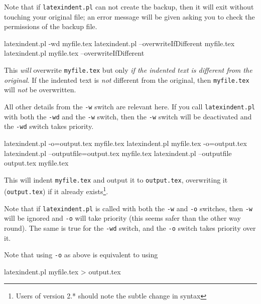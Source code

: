 	Note that if \texttt{latexindent.pl} can not create the backup, then it will exit without
	touching your original file; an error message will be given asking you to check the
	permissions of the backup file.

	\begin{commandshell}
latexindent.pl -wd myfile.tex
latexindent.pl --overwriteIfDifferent myfile.tex
latexindent.pl myfile.tex --overwriteIfDifferent
\end{commandshell}

	This \emph{will} overwrite \texttt{myfile.tex} but only \emph{if the indented text is
	different from the original}. If the indented text is \emph{not} different from the
	original, then \texttt{myfile.tex} will \emph{not} be overwritten.

	All other details from the \texttt{-w} switch are relevant here. If you call
	\texttt{latexindent.pl} with both the \texttt{-wd} and the \texttt{-w} switch, then the
	\texttt{-w} switch will be deactivated and the \texttt{-wd} switch takes priority.

	\begin{commandshell} 
latexindent.pl -o=output.tex myfile.tex
latexindent.pl myfile.tex -o=output.tex 
latexindent.pl --outputfile=output.tex myfile.tex
latexindent.pl --outputfile output.tex myfile.tex
\end{commandshell}

	This will indent \texttt{myfile.tex} and output it to \texttt{output.tex}, overwriting it
	(\texttt{output.tex}) if it already exists\footnote{Users of version 2.* should note the
	subtle change in syntax}.

	Note that if \texttt{latexindent.pl} is called with both the \texttt{-w} and \texttt{-o}
	switches, then \texttt{-w} will be ignored and \texttt{-o} will take priority (this seems
	safer than the other way round). The same is true for the \texttt{-wd} switch, and the
	\texttt{-o} switch takes priority over it.

	Note that using \texttt{-o} as above is equivalent to using
	\begin{commandshell}
latexindent.pl myfile.tex > output.tex
\end{commandshell}

